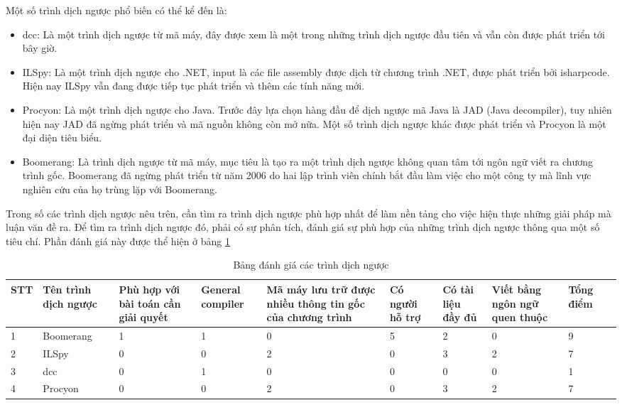 Một số trình dịch ngược phổ biến có thể kể đến là:

\begin{itemize}
	\item dcc: Là một trình dịch ngược từ mã máy, đây được xem là một trong những trình dịch ngược đầu tiên và vẫn còn được phát triển tới bây giờ.
	\item ILSpy: Là một trình dịch ngược cho .NET, input là các file assembly được dịch từ chương trình .NET, được phát triển bởi isharpcode. Hiện nay ILSpy vẫn đang được tiếp tục phát triển và thêm các tính năng mới.
	\item Procyon: Là một trình dịch ngược cho Java. Trước đây lựa chọn hàng đầu để dịch ngược mã Java là JAD (Java decompiler), tuy nhiên hiện nay JAD đã ngừng phát triển và mã nguồn không còn mở nữa. Một số trình dịch ngược khác được phát triển và Procyon là một đại diện tiêu biểu.
	\item Boomerang: Là trình dịch ngược từ mã máy, mục tiêu là tạo ra một trình dịch ngược không quan tâm tới ngôn ngữ viết ra chương trình gốc. Boomerang đã ngừng phát triển từ năm 2006 do hai lập trình viên chính bắt đầu làm việc cho một công ty mà lĩnh vực nghiên cứu của họ trùng lặp với Boomerang.
\end{itemize}

Trong số các trình dịch ngược nêu trên, cần tìm ra trình dịch ngược phù hợp nhất để làm nền tảng cho việc hiện thực những giải pháp mà luận văn đề ra. Để tìm ra trình dịch ngược đó, phải có sự phân tích, đánh giá sự phù hợp của những trình dịch ngược thông qua một số tiêu chí. Phần đánh giá này được thể hiện ở bảng \ref{table:table1}
\begin{table}[h!]
	\centering
	\begin{tabular}{ |p{0.7cm}| p{2cm}| p{1.5cm}| p{1.5cm}| p{2cm}| p{1.5cm}| p{1.5cm}
			| p{1.5cm}| p{1.5cm}| p{1.5cm}| }
	\hline
		STT & Tên trình dịch ngược & Phù hợp với bài toán cần giải quyết & General compiler & Mã máy lưu trữ được nhiều thông tin gốc của chương trình & Có người hỗ trợ & Có tài liệu đầy đủ & Viết bằng ngôn ngữ quen thuộc & Tổng điểm\\
		\hline
		1 & Boomerang & 1 & 1 &0 & 5 & 2 & 0 & 9\\
	\hline
		2 & ILSpy & 0 & 0 & 2 & 0& 3 & 2 & 7\\
		\hline
		3 & dcc & 0 &1&0&0&0&0&1\\
		\hline
		4&Procyon&0&0&2&0&3&2&7\\
		\hline
	\end{tabular}
	\label{table:table1}
	\caption{Bảng đánh giá các trình dịch ngược}
\end{table}
